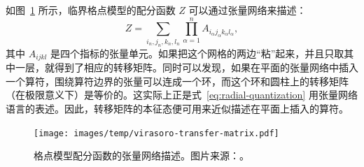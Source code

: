 
如图~\ref{fig:partition-function-tensor-network} 所示，临界格点模型的配分函数 $Z$ 可以通过张量网络来描述：
\begin{equation}
  Z = \sum_{i_n,j_n,k_n,l_n} \prod_{\alpha=1}^n A_{i_\alpha j_\alpha k_\alpha l_\alpha},
  \label{eq:partition-function-tensor-network}
\end{equation}
其中 $A_{ijkl}$ 是四个指标的张量单元。如果把这个网格的两边“粘”起来，并且只取其中一层，就得到了相应的转移矩阵。同时可以发现，如果在平面的张量网络中插入一个算符，围绕算符边界的张量可以连成一个环，而这个环和圆柱上的转移矩阵（在极限意义下）是等价的。这实际上正是式~\eqref{eq:radial-quantization} 用张量网络语言的表述。因此，转移矩阵的本征态便可用来近似描述在平面上插入的算符。

\begin{figure}[ht]
  \centering
  \texttt{[image: images/temp/virasoro-transfer-matrix.pdf]}
  \caption[格点模型配分函数的张量网络描述]{格点模型配分函数的张量网络描述。图片来源：\parencite{wang2022virasoro}。}
  \label{fig:partition-function-tensor-network}
\end{figure}

